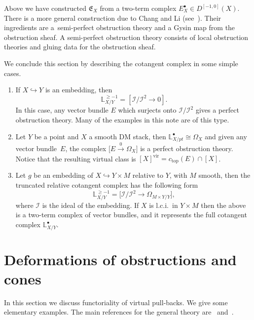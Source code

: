 \documentclass[pdftex]{sigma}
\numberwithin{equation}{section}
\newcommand{\vv}{\mathrm{vir}}
\newcommand{\E}{\mathfrak E}
\begin{document}
\begin{Remark} Above we have constructed $\E_X$ from a two-term complex $E^{\bullet}_X\in D^{[-1,0]}(X)$. There is a more general construction due to Chang and Li (see~\cite{cl:semiperfect}). Their ingredients are a~semi-perfect obstruction theory and a Gysin map from the obstruction sheaf. A semi-perfect obstruction theory consists of local obstruction theories and gluing data for the obstruction sheaf.
\end{Remark}

\begin{Remark}\label{cotcpx} We conclude this section by describing the cotangent complex in some simple cases.
\begin{enumerate}\itemsep=0pt
\item If $X\hookrightarrow Y$ is an embedding, then
\[\mathbb L^{\geq -1}_{X/Y}=[\mathcal I/\mathcal I^2\to 0].\]
In this case, any vector bundle $E$ which surjects onto $\mathcal I/\mathcal I^2$ gives a perfect obstruction theory. Many of the examples in this note are of this type.
\item Let $Y$ be a point and $X$ a smooth DM stack, then $\mathbb L^\bullet_{X/pt}\cong \Omega_X$ and given any vector bundle~$E$, the complex $\big[E\xrightarrow{0} \Omega_X\big]$
is a perfect obstruction theory. Notice that the resulting virtual class is $[X]^{\vv}=c_{\text{top}}(E)\cap [X]$.
\item Let $g$ be an embedding of $X\hookrightarrow Y\times M$ relative to $Y$, with $M$ smooth, then the truncated relative cotangent complex has the following form
\[\mathbb L^{\geq -1}_{X/Y}=\big[\mathcal I/\mathcal I^2\to\Omega_{M\times Y/Y}\big],\]
where $\mathcal I$ is the ideal of the embedding. If $X$ is l.c.i.\ in $Y\times M$ then the above is a two-term complex of vector bundles, and it represents the full cotangent complex $\mathbb L^\bullet_{X/Y}$.
\end{enumerate}
\end{Remark}

\section{Deformations of obstructions and cones}\label{deformations}
In this section we discuss functoriality of virtual pull-backs. We give some elementary examples. The main references for the general theory are~\cite{KKP} and~\cite{vir-pull}.
\end{document}
